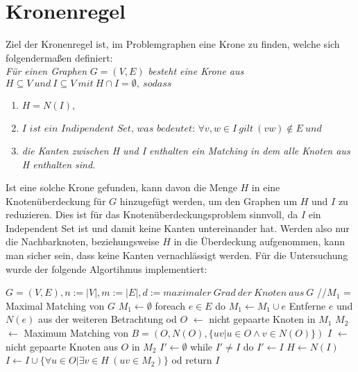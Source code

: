 \section{Kronenregel}
\label{ch:Grundlagen:sec:Kronenregel}
Ziel der Kronenregel ist, im Problemgraphen eine Krone zu finden, welche sich folgendermaßen definiert:\\
\textit{Für einen Graphen} $G=(V,E)$ \textit{besteht eine Krone aus} $H \subseteq V\ und\ I \subseteq V\ mit\ H \cap I = \emptyset,\ sodass$ 
\begin{enumerate}
\item $H = N(I),$ 
\item $\textit{I ist ein Indipendent Set, was bedeutet: }\forall v, w \in I\ gilt\ (vw) \notin E\ und$
\item \textit{die Kanten zwischen H und I enthalten ein Matching in dem alle Knoten aus H enthalten sind.}
\end{enumerate}
Ist eine solche Krone gefunden, kann davon die Menge $H$ in eine Knotenüberdeckung für $G$ hinzugefügt werden, um den Graphen um $H$ und $I$ zu reduzieren. Dies ist für das Knotenüberdeckungsproblem sinnvoll, da $I$ ein Independent Set ist und damit keine Kanten untereinander hat. Werden also nur die Nachbarknoten, beziehungsweise $H$ in die Überdeckung aufgenommen, kann man sicher sein, dass keine Kanten vernachlässigt werden. Für die Untersuchung wurde der folgende Algortihmus implementiert:
\begin{singlespace}
\begin{algorithm}[caption={Kronenregel.}, label={alg2}]
$G = (V, E), n:= |V|, m:=|E|, d:= maximaler\ Grad\ der\ Knoten\ aus\ G$
//$M_{1}$ = Maximal Matching von $G$
  $M_{1} \leftarrow \emptyset$
  foreach $e \in E$ do
    $M_{1} \leftarrow M_{1} \cup e$
    Entferne $e$ und $N(e)$ aus der weiteren Betrachtung
  od
$O$ $\leftarrow$ nicht gepaarte Knoten in $M_{1}$
$M_{2}$ $\leftarrow$ Maximum Matching von $B = (O, N(O), \{ uv| u \in O \wedge v \in N(O)\}) $
$I$ $\leftarrow$ nicht gepaarte Knoten aus $O$ in $M_{2}$
$I'  \leftarrow \emptyset$
while $I' \neq I$ do
  $I' \leftarrow I$
  $H \leftarrow N(I)$
  $I \leftarrow I \cup \{\forall u \in O|\exists v\in H\ (uv \in M_{2})\}$
od
return $I$
\end{algorithm}
\end{singlespace}
